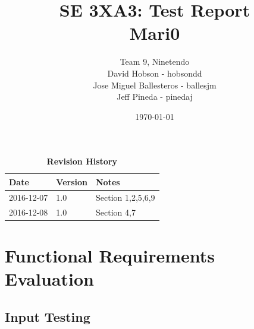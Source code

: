 \documentclass[12pt, titlepage]{article}
\title{SE 3XA3: Test Report\\Mari0}
\author{Team 9, Ninetendo
		\\ David Hobson - hobsondd
		\\ Jose Miguel Ballesteros - ballesjm
		\\ Jeff Pineda - pinedaj
}
\date{\today}
\begin{document}
\maketitle

\tableofcontents
\listoftables
\listoffigures

\begin{table}[bp]
\caption{\bf Revision History}
\begin{tabularx}{\textwidth}{p{3cm}p{2cm}X}
\toprule {\bf Date} & {\bf Version} & {\bf Notes}\\
\midrule
2016-12-07 & 1.0 & Section 1,2,5,6,9\\
2016-12-08 & 1.0 & Section 4,7\\
\bottomrule
\end{tabularx}
\end{table}

\newpage


\section{Functional Requirements Evaluation}

\subsection{Input Testing}
\end{document}
